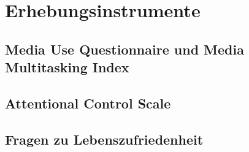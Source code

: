 \section{Erhebungsinstrumente}\label{section.erhebungsinstrumente}
\subsection{Media Use Questionnaire und Media Multitasking Index}\label{subsection.muq}
\subsection{Attentional Control Scale}\label{subsection.acs}
\subsection{Fragen zu Lebenszufriedenheit}\label{subsection.fragenZuLebenszufriedenheit}



